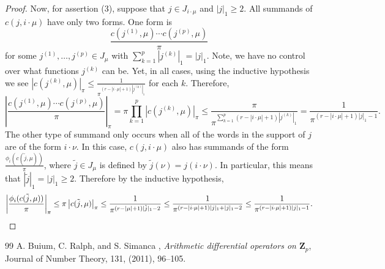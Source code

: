 \documentclass[10pt,a4paper]{amsart}
\newcommand{\ZZ}{\mathbf Z}
\begin{document}
\begin{proof}
Now, for assertion (3), suppose that $j\in J_{i \cdot \mu}$ and $|j|_1\geq 2$. All summands of $c(j,i \cdot \mu)$ have only two forms. One form is \begin{equation*}
\frac{c(j^{(1)},\mu) \cdots c(j^{(p)},\mu)}{\pi}\end{equation*}
for some $j^{(1)},\ldots,j^{(p)} \in J_\mu$ with $\sum_{k=1}^p |j^{(k)}|_1 = |j|_1$. Note,
 we have no control over what functions $j^{(k)}$ can be. Yet, in all cases, using the inductive hypothesis we see $|c(j^{(k)},\mu)|_\pi \leq \frac{1}{\pi^{(r-|i\cdot \mu| + 1)|j^{(k)}|_1}}$ for each $k$. Therefore,  
\[\left|\frac{c(j^{(1)},\mu) \cdots c(j^{(p)},\mu)}{\pi}\right|_\pi =\pi\prod_{k=1}^p|c(j^{(k)},\mu)|_\pi\leq \frac{\pi}{\pi^{\sum_{k=1}^p(r-|i\cdot \mu|+1)|j^{(k)}|_1}} = \frac{1}{\pi^{(r-|i\cdot \mu|+1)|j|_1-1}}.\] The other type of summand only occurs when all of the words in the support of $j$ are of the form $i\cdot \nu$. In this case, $c(j,i\cdot \mu)$ also has summands of the form $\frac{\phi_i(c(\tilde j,\mu))}{\pi}$, where $\tilde j\in J_\mu$ is defined by $\tilde j(\nu) = j(i\cdot \nu)$.  In particular, this means that $|\tilde j|_1 = |j|_1\geq 2$.  Therefore by the inductive hypothesis,
\[\left|\frac{\phi_i(c(\tilde j,\mu))}{\pi}\right|_\pi \leq \pi\left|c(\tilde j,\mu)\right|_\pi \leq \frac{1}{\pi^{(r-|\mu|+1)|\tilde j|_1 - 2}}\leq  \frac{1}{\pi^{(r-|i\cdot \mu| + 1)|j|_1 + |j|_1 -2}}\leq \frac{1}{\pi^{(r-|i\cdot \mu| + 1)|j|_1 - 1}}.\qedhere\]
\end{proof}
    

\begin{thebibliography}{99}
 A. Buium, C. Ralph, and S. Simanca , {\em Arithmetic differential operators on $\ZZ_p$}, Journal of Number Theory, 131, (2011), 96--105.
\end{thebibliography}
\end{document}
